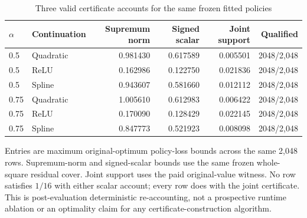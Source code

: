 \begin{table}[htbp]
\caption{Three valid certificate accounts for the same frozen fitted policies}\label{tab:accounts95}
\centering\small
\begin{tabular}{@{}llrrrr@{}}\toprule
$\alpha$ & Continuation & Supremum norm & Signed scalar & Joint support & Qualified\\\midrule
0.5 & Quadratic & 0.981430 & 0.617589 & 0.005501 & 2048/2,048\\
0.5 & ReLU & 0.162986 & 0.122750 & 0.021836 & 2048/2,048\\
0.5 & Spline & 0.943607 & 0.581660 & 0.012112 & 2048/2,048\\
0.75 & Quadratic & 1.005610 & 0.612983 & 0.006422 & 2048/2,048\\
0.75 & ReLU & 0.170090 & 0.128429 & 0.022145 & 2048/2,048\\
0.75 & Spline & 0.847773 & 0.521923 & 0.008098 & 2048/2,048\\
\bottomrule\end{tabular}
\par\smallskip\begin{minipage}{.98\linewidth}\footnotesize
Entries are maximum original-optimum policy-loss bounds across the same 2,048 rows. Supremum-norm and signed-scalar bounds use the same frozen whole-square residual cover. Joint support uses the paid original-value witness. No row satisfies $1/16$ with either scalar account; every row does with the joint certificate. This is post-evaluation deterministic re-accounting, not a prospective runtime ablation or an optimality claim for any certificate-construction algorithm.
\end{minipage}\end{table}
